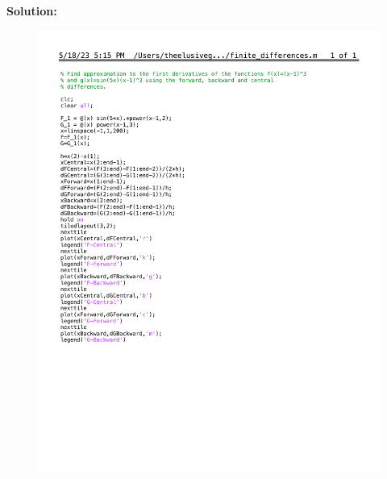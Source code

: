 \documentclass[12pt]{article}
\begin{document}
\begin{enumerate}[label=\bfseries Problem \arabic*:]
\vspace{1em}
\textbf{Solution:}\\
\begin{figure}[h]
    \begin{minipage}{.5\textwidth}
        \centering
        \includegraphics[width=\linewidth]{finite_difference_code.pdf} 
    \end{minipage}%
    \begin{minipage}{.5\textwidth}
        \centering

\end{minipage}
\end{figure}
\end{enumerate}
\end{document}
